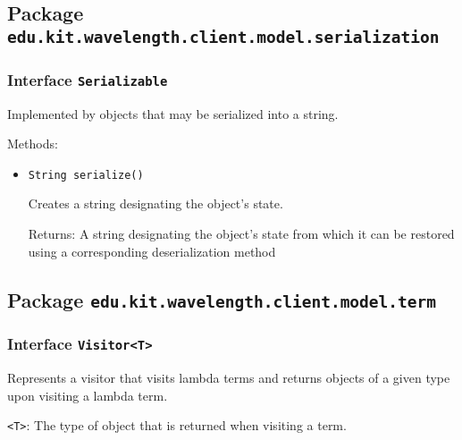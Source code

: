 \subsection{Package \lstinline{edu.kit.wavelength.client.model.serialization}}
\label{pkg:edu.kit.wavelength.client.model.serialization}


\subsubsection{Interface \texttt{Serializable}}
\label{type:edu.kit.wavelength.client.model.serialization.Serializable}
Implemented by objects that may be serialized into a string.

Methods:
\begin{itemize}
\item \texttt{String serialize()}

Creates a string designating the object's state.

Returns: A string designating the object's state from which it
 can be restored using a corresponding deserialization method

\end{itemize}

\subsection{Package \lstinline{edu.kit.wavelength.client.model.term}}
\label{pkg:edu.kit.wavelength.client.model.term}


\subsubsection{Interface \texttt{Visitor<T>}}
\label{type:edu.kit.wavelength.client.model.term.Visitor}
Represents a visitor that visits lambda terms and returns
 objects of a given type upon visiting a lambda term.

\texttt{<T>}: The type of object that is returned when visiting
 a term.

